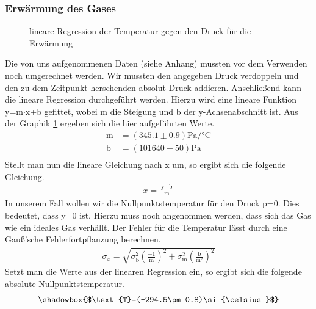 \documentclass[12pt,a4paper,titlepage,headinclude,bibtotoc]{scrartcl}
\begin{document}
\subsubsection{Erwärmung des Gases}
\label{sec:gas1}
\begin{figure}[!h]
\centering

\caption{lineare Regression der Temperatur gegen den Druck für die Erwärmung}
\label{fig:gas1}
\end{figure}
Die von uns aufgenommenen Daten (siehe Anhang) mussten vor dem Verwenden noch umgerechnet werden.
Wir mussten den angegeben Druck verdoppeln und den zu dem Zeitpunkt herschenden absolut Druck addieren.
Anschließend kann die lineare Regression durchgeführt werden.
Hierzu wird eine lineare Funktion y=m$\cdot$x+b gefittet, wobei m die Steigung und b der y-Achsenabschnitt ist.
Aus der Graphik \ref{fig:gas1} ergeben sich die hier aufgeführten Werte.
\begin{align*}
	\text{m} &= (345.1\pm0.9)\si{\pascal/\celsius}\\
	\text{b} &= (101640\pm50)\si{\pascal}\\
\end{align*}
Stellt man nun die lineare Gleichung nach x um, so ergibt sich die folgende Gleichung.
\begin{align}
	x = \frac{\text{y}-\text{b}}{\text{m}}\label{eq:gasfor}
\end{align}
In unserem Fall wollen wir die Nullpunktstemperatur für den Druck p=0.
Dies bedeutet, dass y=0 ist.
Hierzu muss noch angenommen werden, dass sich das Gas wie ein ideales Gas verhällt.
Der Fehler für die Temperatur lässt durch eine Gauß'sche Fehlerfortpflanzung berechnen.
\begin{align}
	\sigma_{x}=\sqrt{\sigma_\text{b}^2\left(\frac{-1}{\text{m}}\right)^2+\sigma_\text{m}^2\left(\frac{\text{b}}{\text{m}^2}\right)^2}\label{eq:fegas}
\end{align}
Setzt man die Werte aus der linearen Regression ein, so ergibt sich die folgende absolute Nullpunktstemperatur.
$$\shadowbox{$\text{T}=(-294.5\pm0.8)\si{\celsius}$}$$
\end{document}
